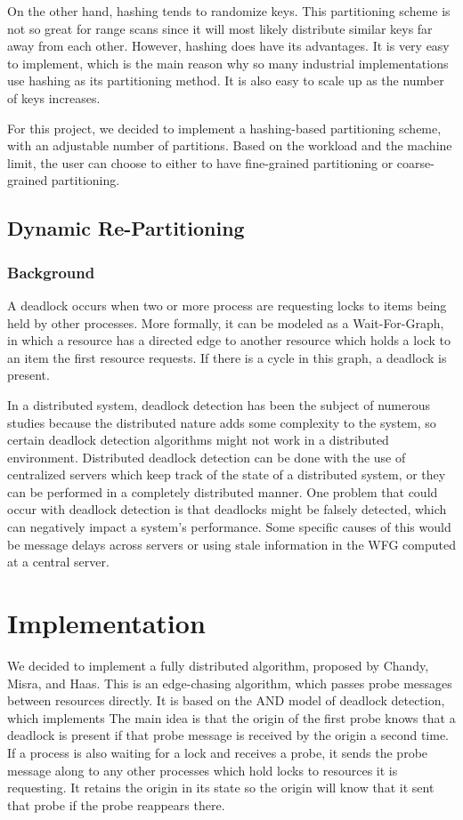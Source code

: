 \documentclass[a4paper, 10pt, notitlepage]{report}
\begin{document}
On the other hand, hashing tends to randomize keys. This partitioning scheme is not so great for range scans
since it will most likely distribute similar keys far away from each other. However, hashing does have its advantages.
It is very easy to implement, which is the main reason why so many industrial implementations use hashing as its
partitioning method. It is also easy to scale up as the number of keys increases. 

For this project, we decided to implement a hashing-based partitioning scheme, with an adjustable number of partitions.
Based on the workload and the machine limit, the user can choose to either to have fine-grained partitioning or
coarse-grained partitioning.

\subsection*{Dynamic Re-Partitioning}

\subsubsection*{Background}
A deadlock occurs when two or more process are requesting locks to items being held by other processes. More formally, it can be modeled as a Wait-For-Graph, in which a resource has a directed edge to another resource which holds a lock to an item the first resource requests. If there is a cycle in this graph, a deadlock is present.

In a distributed system, deadlock detection has been the subject of numerous studies because the distributed nature adds some complexity to the system, so certain deadlock detection algorithms might not work in a distributed environment. Distributed deadlock detection can be done with the use of centralized servers which keep track of the state of a distributed system, or they can be performed in a completely distributed manner. One problem that could occur with deadlock detection is that deadlocks might be falsely detected, which can negatively impact a system's performance. Some specific causes of this would be message delays across servers or using stale information in the WFG computed at a central server.

\section*{Implementation}
We decided to implement a fully distributed algorithm, proposed by Chandy, Misra, and Haas. This is an edge-chasing algorithm, which passes probe messages between resources directly. It is based on the AND model of deadlock detection, which implements The main idea is that the origin of the first probe knows that a deadlock is present if that probe message is received by the origin a second time. If a process is also waiting for a lock and receives a probe, it sends the probe message along to any other processes which hold locks to resources it is requesting. It retains the origin in its state so the origin will know that it sent that probe if the probe reappears there.
\end{document}
